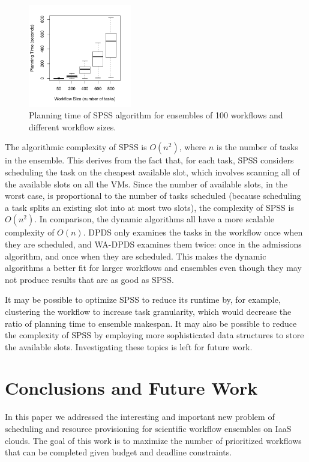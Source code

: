 \documentclass[conference]{IEEEtran}
\begin{document}
\begin{figure}[tb]
    \centering
    \includegraphics[width=0.4\textwidth]{spss_planning_time}
    \caption{Planning time of SPSS algorithm for ensembles of 100 workflows and different workflow sizes.}
    \label{fig:spss_planning_time}
\end{figure}

The algorithmic complexity of SPSS is $O(n^2)$, where $n$ is the number of tasks in the ensemble. This derives from the fact that, for each task, SPSS considers scheduling the task on the cheapest available slot, which involves scanning all of the available slots on all the VMs. Since the number of available slots, in the worst case, is proportional to the number of tasks scheduled (because scheduling a task splits an existing slot into at most two slots), the complexity of SPSS is $O(n^2)$. In comparison, the dynamic algorithms all have a more scalable complexity of $O(n)$. DPDS only examines the tasks in the workflow once when they are scheduled, and WA-DPDS examines them twice: once in the admissions algorithm, and once when they are scheduled. This makes the dynamic algorithms a better fit for larger workflows and ensembles even though they may not produce results that are as good as SPSS.

It may be possible to optimize SPSS to reduce its runtime by, for example, clustering the workflow to increase task granularity, which would decrease the ratio of planning time to ensemble makespan. It may also be possible to reduce the complexity of SPSS by employing more sophisticated data structures to store the available slots. Investigating these topics is left for future work.


\section{Conclusions and Future Work}
\label{sec:conclusions}

In this paper we addressed the interesting and important new problem of scheduling and resource provisioning for scientific workflow ensembles on IaaS clouds. The goal of this work is to maximize the number of prioritized workflows that can be completed given budget and deadline constraints.
\end{document}
